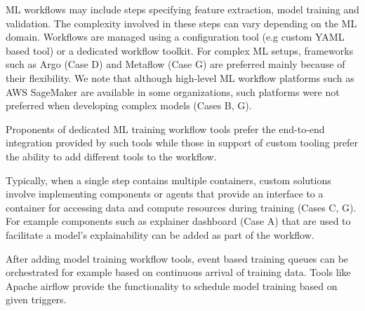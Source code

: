 ML workflows may include steps specifying feature extraction, model training and validation. The complexity involved in these steps can vary depending on the ML domain. Workflows are managed using a configuration tool (e.g custom YAML based tool) or a dedicated workflow toolkit. For complex ML setups, frameworks such as Argo (Case D) and Metaflow (Case G) are preferred mainly because of their flexibility. We note that although high-level ML workflow platforms such as AWS SageMaker are available in some organizations, such platforms were not preferred when developing complex models (Cases B, G).


Proponents of dedicated ML training workflow tools prefer the end-to-end integration provided by such tools while those in support of custom tooling prefer the ability to add different tools to the workflow.

Typically, when a single step contains multiple containers, custom solutions involve implementing components or agents that provide an interface to a container for accessing data and compute resources during training (Cases C, G). For example components such as explainer dashboard (Case A) that are used to facilitate a model's explainability can be added as part of the workflow.

After adding model training workflow tools, event based training queues can be orchestrated for example based on continuous arrival of training data.  Tools like Apache airflow provide the functionality to schedule model training based on given triggers. %


